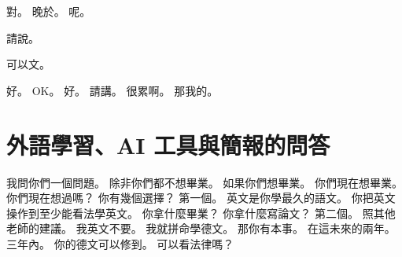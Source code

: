 \hypertarget{w01:cue:3510}{}對。
\hypertarget{w01:cue:3511}{}晚於。
\hypertarget{w01:cue:3512}{}呢。

\hypertarget{w01:cue:3513}{}請說。

\hypertarget{w01:cue:3514}{}可以文。

\hypertarget{w01:cue:3515}{}好。
\hypertarget{w01:cue:3516}{}OK。
\hypertarget{w01:cue:3517}{}好。
\hypertarget{w01:cue:3518}{}請講。
\hypertarget{w01:cue:3519}{}很累啊。
\hypertarget{w01:cue:3520}{}那我的。

\section{外語學習、AI 工具與簡報的問答}

\hypertarget{w01:cue:3521}{}我問你們一個問題。
\hypertarget{w01:cue:3522}{}除非你們都不想畢業。
\hypertarget{w01:cue:3523}{}如果你們想畢業。
\hypertarget{w01:cue:3524}{}你們現在想畢業。
\hypertarget{w01:cue:3525}{}你們現在想過嗎？
\hypertarget{w01:cue:3526}{}你有幾個選擇？
\hypertarget{w01:cue:3527}{}第一個。
\hypertarget{w01:cue:3528}{}英文是你學最久的語文。
\hypertarget{w01:cue:3529}{}你把英文操作到至少能看法學英文。
\hypertarget{w01:cue:3530}{}你拿什麼畢業？
\hypertarget{w01:cue:3531}{}你拿什麼寫論文？
\hypertarget{w01:cue:3532}{}第二個。
\hypertarget{w01:cue:3533}{}照其他老師的建議。
\hypertarget{w01:cue:3534}{}我英文不要。
\hypertarget{w01:cue:3535}{}我就拼命學德文。
\hypertarget{w01:cue:3536}{}那你有本事。
\hypertarget{w01:cue:3537}{}在這未來的兩年。
\hypertarget{w01:cue:3538}{}三年內。
\hypertarget{w01:cue:3539}{}你的德文可以修到。
\hypertarget{w01:cue:3540}{}可以看法律嗎？

